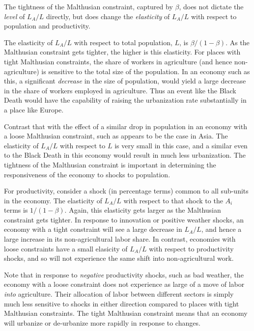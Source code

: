 \documentclass[11pt]{article}
\begin{document}
The tightness of the Malthusian constraint, captured by $\beta$, does not dictate the \textit{level} of $L_A/L$ directly, but does change the \textit{elasticity} of $L_A/L$ with respect to population and productivity. 

The elasticity of $L_A/L$ with respect to total population, $L$, is $\beta/(1-\beta)$. As the Malthusian constraint gets tighter, the higher is this elasticity. For places with tight Malthusian constraints, the share of workers in agriculture (and hence non-agriculture) is sensitive to the total size of the population. In an economy such as this, a significant \textit{decrease} in the size of population, would yield a large decrease in the share of workers employed in agriculture. Thus an event like the Black Death would have the capability of raising the urbanization rate substantially in a place like Europe.

Contrast that with the effect of a similar drop in population in an economy with a loose Malthusian constraint, such as appears to be the case in Asia. The elasticity of $L_A/L$ with respect to $L$ is very small in this case, and a similar even to the Black Death in this economy would result in much less urbanization. The tightness of the Malthusian constraint is important in determining the responsiveness of the economy to shocks to population.

For productivity, consider a shock (in percentage terms) common to all sub-units in the economy. The elasticity of $L_A/L$ with respect to that shock to the $A_i$ terms is $1/(1-\beta)$. Again, this elasticity gets larger as the Malthusian constraint gets tighter. In response to innovation or positive weather shocks, an economy with a tight constraint will see a large decrease in $L_A/L$, and hence a large increase in its non-agricultural labor share. In contrast, economies with loose constraints have a small elasicity of $L_A/L$ with respect to productivity shocks, and so will not experience the same shift into non-agricultural work. 

Note that in response to \textit{negative} productivity shocks, such as bad weather, the economy with a loose constraint does not experience as large of a move of labor \textit{into} agriculture. Their allocation of labor between different sectors is simply much less sensitive to shocks in either direction compared to places with tight Malthusian constraints. The tight Malthusian constraint means that an economy will urbanize or de-urbanize more rapidly in response to changes.
\end{document}
